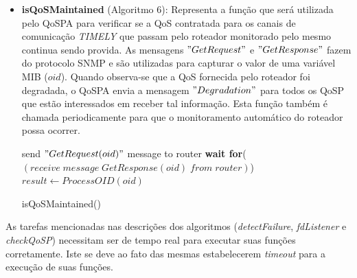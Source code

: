\begin{itemize}
\item \textbf{isQoSMaintained} (Algoritmo 6): Representa a função que será utilizada pelo QoSPA para verificar se a QoS contratada para os canais de comunicação \textit{TIMELY} que passam pelo roteador monitorado pelo mesmo continua sendo provida. As mensagens $"GetRequest"$ e $"GetResponse"$ fazem do protocolo SNMP e são utilizadas para capturar o valor de uma variável MIB ($oid$). Quando observa-se que a QoS fornecida pelo roteador foi degradada, o QoSPA envia a mensagem $"Degradation"$ para todos os QoSP que estão interessados em receber tal informação. Esta função também é chamada periodicamente para que o monitoramento automático do roteador possa ocorrer.

\begin{algorithm}[H]
	send $"GetRequest(oid)"$ message to router\;
	\textbf{wait for}($(receive \; message \; GetResponse(oid) \; from \; router)$)\;
	$result \leftarrow ProcessOID(oid)$\;
\caption{isQoSMaintained()}
\end{algorithm}
\end{itemize}

	As tarefas mencionadas nas descrições dos algoritmos (\textit{detectFailure}, \textit{fdListener} e \textit{checkQoSP}) necessitam ser de tempo real para executar suas funções corretamente. Iste se deve ao fato das mesmas estabelecerem \textit{timeout} para a execução de suas funções.